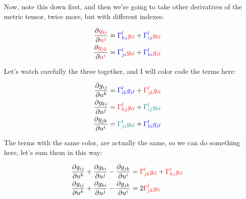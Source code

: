 Now, note this down first, and then we're going to take other derivatives of the metric tensor, twice more, but with different indexes:

\begin{align*}
    \frac{\partial \begingroup\color{red}g_{ki}\endgroup}{\partial \begingroup\color{red}u^j\endgroup} &= \begingroup\color{blue}\Gamma^{l}_{kj}\endgroup \begingroup\color{red}g_{il}\endgroup + \begingroup\color{blue}\Gamma^{l}_{ij}\endgroup \begingroup\color{red}g_{kl}\endgroup\\
    \frac{\partial \begingroup\color{red}g_{jk}\endgroup}{\partial \begingroup\color{red}u^i\endgroup} &= \begingroup\color{blue}\Gamma^{l}_{ji}\endgroup \begingroup\color{red}g_{kl}\endgroup + \begingroup\color{blue}\Gamma^{l}_{ki}\endgroup \begingroup\color{red}g_{jl}\endgroup
\end{align*}

Let's watch carefully the three together, and I will color code the terms here:

\begin{align*}
    \frac{\partial g_{ij}}{\partial u^k} &= \begingroup\color{blue}\Gamma^{l}_{ik}\endgroup \begingroup\color{blue}g_{jl}\endgroup + \begingroup\color{red}\Gamma^{l}_{jk}\endgroup \begingroup\color{red}g_{il}\endgroup\\
    \frac{\partial g_{ki}}{\partial u^j} &= \begingroup\color{red}\Gamma^{l}_{kj}\endgroup \begingroup\color{red}g_{il}\endgroup + \begingroup\color{teal}\Gamma^{l}_{ij}\endgroup \begingroup\color{teal}g_{kl}\endgroup\\
    \frac{\partial g_{jk}}{\partial u^i} &= \begingroup\color{teal}\Gamma^{l}_{ji}\endgroup \begingroup\color{teal}g_{kl}\endgroup + \begingroup\color{blue}\Gamma^{l}_{ki}\endgroup \begingroup\color{blue}g_{jl}\endgroup
\end{align*}

The terms with the same color, are actually the same, so we can do something here, let's sum them in this way:

\begin{align*}
    \frac{\partial g_{ij}}{\partial u^k} + \frac{\partial g_{ki}}{\partial u^j} - \frac{\partial g_{jk}}{\partial u^i} &= 
    \begingroup\color{red}\Gamma^{l}_{jk}\endgroup \begingroup\color{red}g_{il}\endgroup + \begingroup\color{red}\Gamma^{l}_{kj}\endgroup \begingroup\color{red}g_{il}\endgroup\\
     \frac{\partial g_{ij}}{\partial u^k} + \frac{\partial g_{ki}}{\partial u^j} - \frac{\partial g_{jk}}{\partial u^i} &= 2 \begingroup\color{red}\Gamma^{l}_{jk}\endgroup \begingroup\color{red}g_{li}\endgroup
\end{align*}

